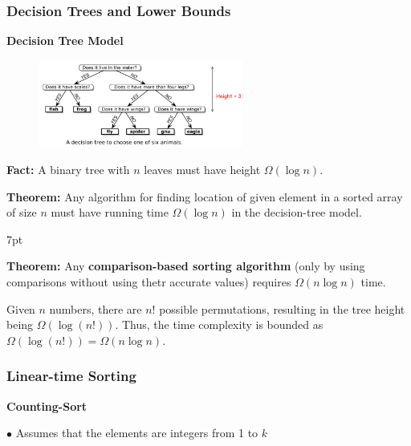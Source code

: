 \documentclass[10pt]{article}
\newenvironment{formal}[2]{%
	\def\FrameCommand{%
		\hspace{1pt}%
		{\color{#1}\vrule width 2pt}%
		{\color{#2}\vrule width 4pt}%
		\colorbox{#2}%
	}%
	\MakeFramed{\advance\hsize-\width\FrameRestore}%
	\noindent\hspace{-4.55pt}%
	\begin{adjustwidth}{}{7pt}%
		\vspace{2pt}\vspace{2pt}%
	}
	{%
		\vspace{2pt}\end{adjustwidth}\endMakeFramed%
}
\begin{document}
\subsubsection{Decision Trees and Lower Bounds}

\textbf{Decision Tree Model}
\begin{figure}[h]
	\centering
	\includegraphics[width=0.6\textwidth]{img4-4}
\end{figure}

\textbf{Fact:} A binary tree with $n$ leaves must have height $\Omega(\log n)$.

\textbf{Theorem:} Any algorithm for finding location of given element in a sorted array of size $n$ must have running time $\Omega(\log n)$ in the decision-tree model.

\begin{formal}{Green}{greenshade}
	
	\textbf{Theorem:} Any \textbf{comparison-based sorting algorithm} (only by using comparisons without using thetr accurate values) requires $\Omega(n\log n)$ time.
	
	Given $n$ numbers, there are $n!$ possible permutations, resulting in the tree height being $\Omega(\log(n!))$. Thus, the time complexity is bounded as $\Omega(\log(n!)) = \Omega(n\log n)$.
	
\end{formal}

\subsubsection{Linear-time Sorting}

\textbf{Counting-Sort}

$\bullet$ Assumes that the elements are integers from 1 to $k$
\end{document}
